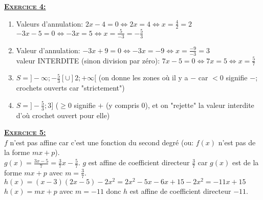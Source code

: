 \documentclass[12pt,a4paper]{article}
\begin{document}
\vspace{0,5cm}

\textbf{\textsc{\underline{Exercice 4:}}}\medskip
\begin{enumerate}
\item 
Valeurs d'annulation: $2x-4=0\iff 2x=4\iff x=\frac{4}{2}=2$\\
$-3x-5=0\iff -3x=5\iff x=\frac{5}{-3}=-\frac{5}{3}$
\begin{center}
\end{center}
\medskip
\item Valeur d'annulation: $-3x+9=0\iff -3x=-9\iff x=\frac{-9}{-3}=3$\\
valeur INTERDITE (sinon division par zéro): $7x-5=0\iff 7x=5\iff x=\frac{5}{7}$
\begin{center}
\end{center}
\item $S=]-\infty;-\frac{5}{3}[\cup ]2;+\infty[$ (on donne les zones où il y a $-$ car $<0$ signifie $-$; crochets ouverts car "strictement")\medskip
\item $S=]-\frac{5}{3};3]$ ($\geqslant 0$ signifie $+$ (y compris 0), et on "rejette" la valeur interdite d'où crochet ouvert pour elle)
\end{enumerate}
\vspace{0,5cm}
\textbf{\textsc{\underline{Exercice 5:}}}\medskip\\
$f$ n'est pas affine car c'est une fonction du second degré (ou: $f(x)$ n'est pas de la forme $mx+p$).\medskip\\
$g(x)=\frac{3x-5}{7}=\frac{3}{7}x-\frac{5}{7}$. $g$ est affine de coefficient directeur $\frac{3}{7}$ car $g(x)$ est de la forme $mx+p$ avec $m=\frac{3}{7}$.\\
$h(x)=(x-3)(2x-5)-2x^2=2x^2-5x-6x+15-2x^2=-11x+15$\medskip\\
$h(x)=mx+p$ avec $m=-11$ donc $h$ est affine de coefficient directeur $-11$.
\end{document}
